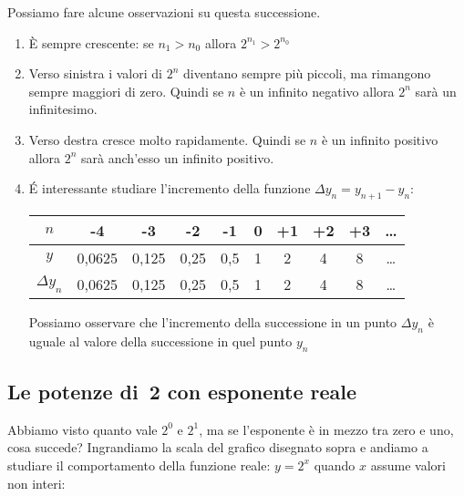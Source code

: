 \begin{osservazione}
Possiamo fare alcune osservazioni su questa successione.

\begin{enumerate}
 \item 
  È sempre crescente: se \(n_1 > n_0\) allora \(2^{n_1} > 2^{n_0}\)
 \item 
  Verso sinistra i valori di \(2^n\) diventano sempre più piccoli, ma rimangono 
  sempre maggiori di zero. Quindi se \(n\) è un infinito negativo 
  allora \(2^n\) sarà un infinitesimo.
 \item 
  Verso destra cresce molto rapidamente. Quindi se \(n\) è un infinito positivo 
  allora \(2^n\) sarà anch'esso un infinito positivo.
 \item 
  \'E interessante studiare l'incremento della funzione \;$\Delta y_n = y_{n+1}-y_n$:
\begin{center}
\renewcommand\arraystretch{1.8}
\begin{tabular}{c|ccccccccc}
$n$ & -4    & -3    & -2   & -1  & 0 & +1 & +2 & +3  & \dots \\
\hline 
$y$ & 0,0625 & 0,125 & 0,25 & 0,5 & 1 & 2  & 4  & 8 & \dots\\
\hline
$\Delta y_n$ & 
  0,0625 & 0,125 & 0,25 & 0,5 & 1 & 2  & 4  & 8& \dots \\
\end{tabular}
\end{center}

  Possiamo osservare che l'incremento della successione in un punto $\Delta y_n$
  è uguale al valore della successione in quel punto $y_n$

\end{enumerate}
\end{osservazione}

\subsection{Le potenze di~2 con esponente reale}
\label{subsec:esplog_potdue}

Abbiamo visto quanto vale \(2^0\) e \(2^1\), ma se l'esponente è in mezzo 
tra zero e uno, cosa succede? Ingrandiamo la scala del grafico disegnato sopra 
e andiamo a studiare il comportamento della funzione reale: \(y=2^x\) quando 
\(x\) assume valori non interi:


